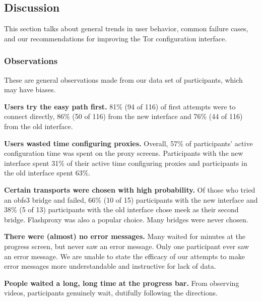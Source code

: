 \documentclass[USenglish,oneside,twocolumn]{article}
\begin{document}
\subsection{Discussion} 
This section talks about general trends in user behavior, common failure cases, and our recommendations for 
improving the Tor configuration interface. 

\subsubsection{Observations}
These are general observations made from our data set of participants, which may have biases.\\

\begin{description}
\item {\bfseries Users try the easy path first.}
81\% (94 of 116) of first attempts were to connect directly, 86\% (50 of 116) from the new interface and 76\% (44 of 116) from the old interface. 

\item {\bfseries Users wasted time configuring proxies.} Overall, 57\% of participants' active configuration time was spent on the proxy screens. Participants with the new interface spent 31\% of their active time configuring proxies and participants in the old interface spent 63\%.

\item {\bfseries Certain transports were chosen with high probability.}
Of those who tried an obfs3 bridge and failed, 
66\% (10 of 15) participants with the new interface and 38\% (5 of 13) participants with the old interface chose meek as their second bridge. Flashproxy was also a popular choice. Many bridges were never chosen. 

\item {\bfseries There were (almost) no error messages.} Many waited for minutes at the progress screen, but never saw an error message. Only one participant ever saw an error message. We are unable to state the efficacy of our attempts to make error messages more understandable and instructive for lack of data.  

\item {\bfseries People waited a long, long time at the progress bar.}
From observing videos, participants genuinely wait, dutifully following the directions.   
\end{description} 
\end{document}
